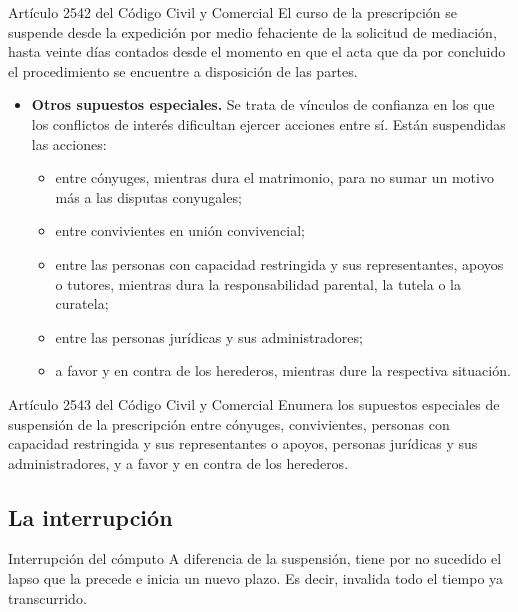 \documentclass[12pt,oneside]{book}
\begin{document}
\begin{articulo}{Artículo 2542 del Código Civil y Comercial}
El curso de la prescripción se suspende desde la expedición por medio fehaciente de la solicitud de mediación, hasta veinte días contados desde el momento en que el acta que da por concluido el procedimiento se encuentre a disposición de las partes.
\end{articulo}

\begin{itemize}
    \item \textbf{Otros supuestos especiales.} Se trata de vínculos de confianza en los que los conflictos de interés dificultan ejercer acciones entre sí. Están suspendidas las acciones:
    \begin{itemize}
        \item entre cónyuges, mientras dura el matrimonio, para no sumar un motivo más a las disputas conyugales;
        \item entre convivientes en unión convivencial;
        \item entre las personas con capacidad restringida y sus representantes, apoyos o tutores, mientras dura la responsabilidad parental, la tutela o la curatela;
        \item entre las personas jurídicas y sus administradores;
        \item a favor y en contra de los herederos, mientras dure la respectiva situación.
    \end{itemize}
\end{itemize}

\begin{articulo}{Artículo 2543 del Código Civil y Comercial}
Enumera los supuestos especiales de suspensión de la prescripción entre cónyuges, convivientes, personas con capacidad restringida y sus representantes o apoyos, personas jurídicas y sus administradores, y a favor y en contra de los herederos.
\end{articulo}

\subsection{La interrupción}

\begin{definition}{Interrupción del cómputo}
A diferencia de la suspensión, tiene por no sucedido el lapso que la precede e inicia un nuevo plazo. Es decir, invalida todo el tiempo ya transcurrido.
\end{definition}
\end{document}

